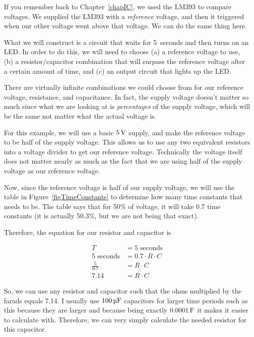 If you remember back to Chapter~\ref{chapIC}, we used the LM393 to compare voltages.
We supplied the LM393 with a \emph{reference} voltage, and then it triggered when our other voltage went above that voltage.
We can do the same thing here.

What we will construct is a circuit that waits for 5~seconds and then turns on an LED.
In order to do this, we will need to choose (a) a reference voltage to use, (b) a resistor/capacitor combination that will surpass the reference voltage after a certain amount of time, and (c) an output circuit that lights up the LED.

There are virtually infinite combinations we could choose from for our reference voltage, resistance, and capacitance.
In fact, the supply voltage doesn't matter so much since what we are looking at is \emph{percentages} of the supply voltage, which will be the same not matter what the actual voltage is.


For this example, we will use a basic $5\,\si{\volt}$ supply, and make the reference voltage to be half of the supply voltage.
This allows us to use any two equivalent resistors into a voltage divider to get our reference voltage.
Technically the voltage itself does not matter nearly as much as the fact that we are using half of the supply voltage as our reference voltage.

Now, since the reference voltage is half of our supply voltage, we will use the table in Figure~\ref{figTimeConstants} to determine how many time constants that needs to be.
The table says that for 50\% of voltage, it will take 0.7 time constants (it is actually 50.3\%, but we are not being that exact).

Therefore, the equation for our resistor and capacitor is 

\begin{align*}
T &= 5\textrm{ seconds} \\
5 \textrm{ seconds} &= 0.7\cdot R\cdot C \\
\frac{5}{0.7} &= R\cdot C \\
7.14 &= R\cdot C
\end{align*}

So, we can use any resistor and capacitor such that the ohms multiplied by the farads equals 7.14.
I usually use $100\,\si{\micro\farad}$ capacitors for larger time periods such as this because they are larger and because being exactly $0.0001\,\si{\farad}$ it makes it easier to calculate with.
Therefore, we can very simply calculate the needed resistor for this capacitor.

